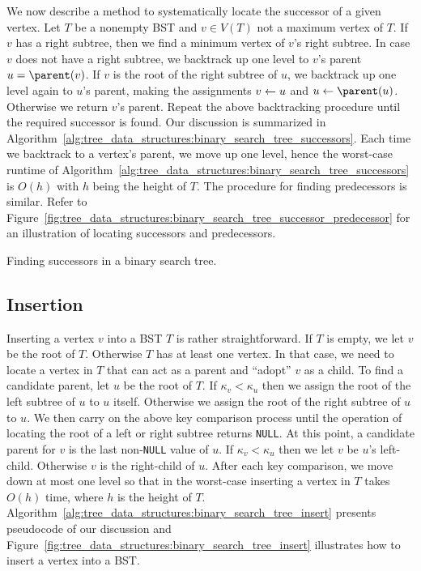 We now describe a method to systematically locate the successor of a
given vertex. Let $T$ be a nonempty BST and $v \in V(T)$ not a maximum
vertex of $T$. If $v$ has a right subtree, then we find a minimum
vertex of $v$'s right subtree. In case $v$ does not have a right
subtree, we backtrack up one level to $v$'s parent
$u = \parent(v)$. If $v$ is the root of the right subtree of $u$, we
backtrack up one level again to $u$'s parent, making the assignments
$v \leftarrow u$ and $u \assign \parent(u)$. Otherwise we return $v$'s
parent. Repeat the above backtracking procedure until the required
successor is found. Our discussion is summarized in
Algorithm~\ref{alg:tree_data_structures:binary_search_tree_successors}.
Each time we backtrack to a vertex's parent, we move up one
level, hence the worst-case runtime of
Algorithm~\ref{alg:tree_data_structures:binary_search_tree_successors}
is $O(h)$ with $h$ being the height of $T$. The procedure for finding
predecessors is similar. Refer to
Figure~\ref{fig:tree_data_structures:binary_search_tree_successor_predecessor}
for an illustration of locating successors and predecessors.

\begin{algorithm}[!htbp]

\caption{Finding successors in a binary search tree.}
\label{alg:tree_data_structures:binary_search_tree_successors}
\end{algorithm}



\subsection{Insertion}

Inserting a vertex $v$ into a BST $T$ is rather straightforward. If
$T$ is empty, we let $v$ be the root of $T$. Otherwise $T$ has at
least one vertex. In that case, we need to locate a vertex in $T$ that
can act as a parent and ``adopt'' $v$ as a child. To find a candidate
parent, let $u$ be the root of $T$. If $\kappa_v < \kappa_u$ then we
assign the root of the left subtree of $u$ to $u$ itself. Otherwise we
assign the root of the right subtree of $u$ to $u$. We then carry on
the above key comparison process until the operation of locating the
root of a left or right subtree returns \texttt{NULL}. At this point,
a candidate parent for $v$ is the last non-\texttt{NULL} value of
$u$. If $\kappa_v < \kappa_u$ then we let $v$ be $u$'s
left-child. Otherwise $v$ is the right-child of $u$. After each key
comparison, we move down at most one level so that in the worst-case
inserting a vertex in $T$ takes $O(h)$ time, where $h$ is the height
of $T$.
Algorithm~\ref{alg:tree_data_structures:binary_search_tree_insert}
presents pseudocode of our discussion and
Figure~\ref{fig:tree_data_structures:binary_search_tree_insert}
illustrates how to insert a vertex into a BST.


